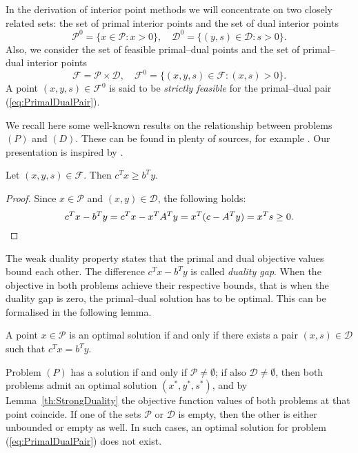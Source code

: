 In the derivation of interior point methods we will concentrate on
two closely related sets: the set of primal interior points and
the set  of dual interior points 
\[
\mathcal{P}^0 = \{ x \in \mathcal{P} : x > 0 \}, \quad
\mathcal{D}^0 = \{ (y,s) \in \mathcal{D} : s > 0 \}.
\]
Also, we consider the set of feasible primal--dual points 
and the set of primal--dual interior points
\[
\mathcal{F} = \mathcal{P} \times \mathcal{D}, \quad
\mathcal{F}^0 = \{ (x,y,s) \in \mathcal{F} : (x,s) > 0 \}.
\]
A point $(x,y,s) \in \mathcal{F}^0$ is said to be {\em strictly feasible}
for the primal--dual pair (\ref{eq:PrimalDualPair}).

We recall here some well-known results on the relationship between
problems $(P)$ and $(D)$.
These can be found in plenty of sources, for example 
\cite{lp:Chvatal,Schrijver86}.
Our presentation is inspired by 
\cite{GulerRoosTerlakyVial,Megiddo,ipm:Wright97}.

\begin{lemma}
Let $(x,y,s) \in \mathcal{F}$. Then $c^Tx \ge b^Ty$.
\end{lemma}
%
\begin{proof}
Since $x \in \mathcal{P}$ and $(x,y) \in \mathcal{D}$, 
the following holds:
\[
  c^Tx - b^Ty = c^Tx - x^TA^Ty = x^T(c - A^T y) = x^Ts \ge 0. \qedhere
\]
\end{proof}

The weak duality property states that the primal and dual objective
values bound each other.
The difference $c^Tx - b^Ty$ is called {\em duality gap}.
When the objective in both problems achieve their respective bounds,
that is when the duality gap is zero, the primal--dual solution has
to be optimal. This can be formalised
in the following lemma.

\begin{lemma}  \label{th:StrongDuality}
A point $x \in \mathcal{P}$ is an optimal solution if and only if
there exists a pair $(x,s) \in \mathcal{D}$ such that $c^Tx = b^Ty$.
\end{lemma}

Problem $(P)$ has a solution if and only if $\mathcal{P} \ne \emptyset$;
if also $\mathcal{D} \ne \emptyset$, then both problems admit an
optimal solution $(x^*, y^*, s^*)$, and by Lemma~\ref{th:StrongDuality}
the objective function 
values of both problems at that point coincide. 
If one of the sets $\mathcal{P}$ or $\mathcal{D}$ is empty, 
then the other is either unbounded or empty as well. 
In such cases, an optimal
solution for problem (\ref{eq:PrimalDualPair}) does not exist.

